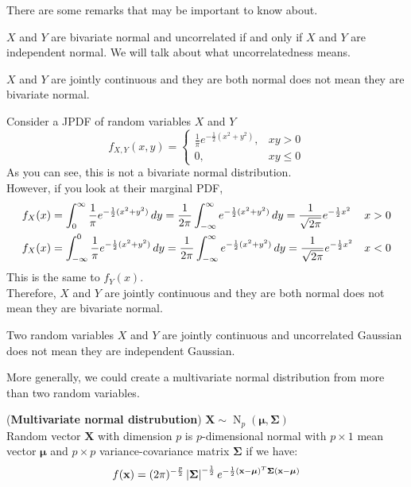 \documentclass{huhtakm-template-book}
\DeclareMathOperator{\N}{N}
\begin{document}
There are some remarks that may be important to know about.
\begin{rem}
	$X$ and $Y$ are bivariate normal and uncorrelated if and only if $X$ and $Y$ are independent normal. We will talk about what uncorrelatedness means.
\end{rem}
\begin{rem}
	$X$ and $Y$ are jointly continuous and they are both normal does not mean they are bivariate normal.
\end{rem}
\begin{eg}
	Consider a JPDF of random variables $X$ and $Y$
	\begin{equation*}
		f_{X,Y}(x,y)=\begin{cases}
			\frac{1}{\pi}e^{-\frac{1}{2}(x^{2}+y^{2})}, &xy>0\\
			0, &xy\leq 0
		\end{cases}
	\end{equation*}
	As you can see, this is not a bivariate normal distribution.\\
	However, if you look at their marginal PDF,
	\begin{align*}
		f_{X}(x)&=\int_{0}^{\infty}\frac{1}{\pi}e^{-\frac{1}{2}(x^{2}+y^{2})}\,dy=\frac{1}{2\pi}\int_{-\infty}^{\infty} e^{-\frac{1}{2}(x^{2}+y^{2})}\,dy=\frac{1}{\sqrt{2\pi}}e^{-\frac{1}{2}x^{2}} & x&>0\\
		f_{X}(x)&=\int_{-\infty}^{0}\frac{1}{\pi}e^{-\frac{1}{2}(x^{2}+y^{2})}\,dy=\frac{1}{2\pi}\int_{-\infty}^{\infty} e^{-\frac{1}{2}(x^{2}+y^{2})}\,dy=\frac{1}{\sqrt{2\pi}}e^{-\frac{1}{2}x^{2}} & x&<0
	\end{align*}
	This is the same to $f_{Y}(x)$.\\
	Therefore, $X$ and $Y$ are jointly continuous and they are both normal does not mean they are bivariate normal.
\end{eg}
\begin{rem}
	Two random variables $X$ and $Y$ are jointly continuous and uncorrelated Gaussian does not mean they are independent Gaussian.
\end{rem}
More generally, we could create a multivariate normal distribution from more than two random variables.
\begin{eg}(\textbf{Multivariate normal distrubution}) $\mathbf{X}\sim\N_{p}(\boldsymbol{\mu},\mathbf{\Sigma})$\\
	Random vector $\mathbf{X}$ with dimension $p$ is $p$-dimensional normal with $p\times 1$ mean vector $\boldsymbol{\mu}$ and $p\times p$ variance-covariance matrix $\mathbf{\Sigma}$ if we have:
	\begin{equation*}
		f(\mathbf{x})=(2\pi)^{-\frac{p}{2}}\left|{\mathbf{\Sigma}}\right|^{-\frac{1}{2}}e^{-\frac{1}{2}(\mathbf{x}-\boldsymbol{\mu})^{T}\mathbf{\Sigma}(\mathbf{x}-\boldsymbol{\mu})}
	\end{equation*}
\end{eg}
\end{document}
